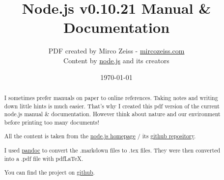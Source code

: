 \documentclass[10pt, a4paper, titlepage, oneside, plain]{article}
\begin{document}
	\title{Node.js v0.10.21 Manual \& Documentation}
	\author{PDF created by Mirco Zeiss - \href{http://mircozeiss.com}{mircozeiss.com}\\Content by \href{http://www.nodejs.org}{node.js} and its creators}
	\date{\today}

	\maketitle

	\begin{abstract}
	I sometimes prefer manuals on paper to online references. Taking notes and writing down little hints is much easier. That's why I created this pdf version of the current node.js manual \& documentation. However think about nature and our environment before printing too many documents!

	All the content is taken from the \href{http://www.nodejs.org}{node.js homepage} / its \href{https://github.com/joyent/node}{github repository}.

	I used \href{http://johnmacfarlane.net/pandoc/}{pandoc} to convert the .markdown files to .tex files. They were then converted into a .pdf file with pdfLaTeX.

	You can find the project on \href{https://github.com/zeMirco/nodejs-pdf-docs}{github}.
	\end{abstract}

	\tableofcontents

	
	
	
	
	
	
	
					
	
	
	
	
	
				
	
	
	
	
	
	
	
	
	
	
	
	
\end{document}
